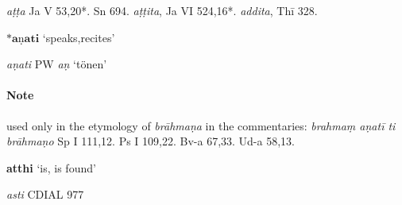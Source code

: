 \documentclass[11pt]{article}
\newcommand*\ṛ{r\symbol{"325}}
\newcommand*\Ṛ{R\symbol{"325}}
\newcommand*\ṝ{r\symbol{"304}\symbol{"325}}
\newcommand*\Ṝ{R\symbol{"304}\symbol{"325}}
\newcommand*\ḷ{l\symbol{"325}}
\newcommand*\ḹ{l\symbol{"304}\symbol{"325}}
\newcommand*\Ḷ{L\symbol{"325}}
\newcommand*\Ḹ{L\symbol{"304}\symbol{"325}}
\begin{document}
\begin{description}[leftmargin=\parindent]
\item[ppp.]
\textit{aṭṭa} Ja V 53,20*. Sn 694.
\textit{aṭṭita},
Ja VI 524,16*.
\textit{addita}, Thī 328.
\end{description}


%
%
\begin{center}
{\Large
$*\textbf{aṇati}$ `speaks,recites'
}
\end{center}

\begin{description}[leftmargin=\parindent]
\item[skt.] \textit{aṇati} PW \textit{aṇ} `tönen'
\end{description}

\paragraph*{Note}
used only in the etymology of \textit{brāhmaṇa} in the commentaries:
\textit{brahmaṃ aṇatī ti brāhmaṇo} Sp I 111,12. Ps I 109,22. Bv-a 67,33. Ud-a 58,13.\\


%
%
\begin{center}
{\Large
\textbf{atthi} `is, is found'
}
\end{center}
\begin{description}[leftmargin=\parindent]
\item[skt.] \textit{asti} CDIAL 977
\end{description}
\end{document}
